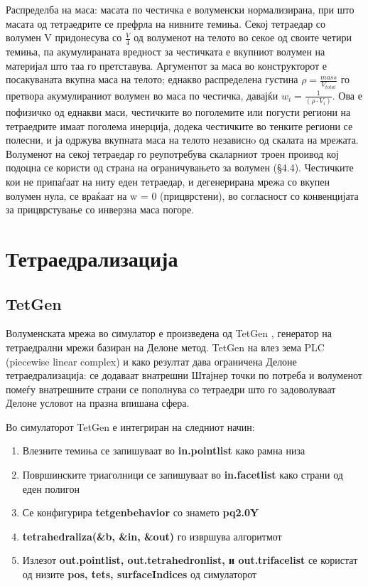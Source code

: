Распределба на маса: масата по честичка е волуменски нормализирана, при што масата од тетраедрите се префрла на нивните темиња. Секој тетраедар со волумен V придонесува со $\frac{V}{4}$ од волуменот на телото во секое од своите четири темиња, па акумулираната вредност за честичката е вкупниот волумен на материјал што таа го претставува. Аргументот за маса во конструкторот е посакуваната вкупна маса на телото; еднакво распределена густина $\rho = \frac{mass}{V_{total}}$ го претвора акумулираниот волумен во маса по честичка, давајќи $w_i = \frac{1}{(\rho \cdot V_i)}$. Ова е пофизичко од еднакви маси, честичките во поголемите или погусти региони на тетраедрите имаат поголема инерција, додека честичките во тенките региони се полесни, и ја одржува вкупната маса на телото независнo од скалата на мрежата. Волуменот на секој тетраедар го реупотребува скаларниот троен проивод кој подоцна се користи од страна на ограничувањето за волумен (§4.4). Честичките кои не припаѓаат на ниту еден тетраедар, и дегенерирана мрежа со вкупен волумен нула, се враќаат на w = 0 (прицврстени), во согласност со конвенцијата за прицврстување со инверзна маса погоре.


\section{Тетраедрализација}
\subsection{TetGen}

Волуменската мрежа во симулатор е произведена од TetGen \cite{tetgen}, генератор на тетраедрални мрежи базиран на Делоне метод. TetGen на влез зема PLC (piecewise linear complex) и како резултат дава ограничена Делоне тетраедрализација: се додаваат внатрешни Штајнер точки по потреба и волуменот помеѓу внатрешните страни се пополнува со тетраедри што го задоволуваат Делоне условот на празна впишана сфера.

Во симулаторот TetGen е интегриран на следниот начин:
\begin{enumerate}
	\item Влезните темиња се запишуваат во \textbf{in.pointlist} како рамна низа
	\item Површинските триаголници се запишуваат во \textbf{in.facetlist} како страни од еден полигон
	\item Се конфигурира \textbf{tetgenbehavior} со знамето \textbf{pq2.0Y}
	\item \textbf{tetrahedraliza(\&b, \&in, \&out)} го извршува алгоритмот
	\item Излезот \textbf{out.pointlist, out.tetrahedronlist, и out.trifacelist} се користат од низите \textbf{pos, tets, surfaceIndices} од симулаторот
\end{enumerate}

